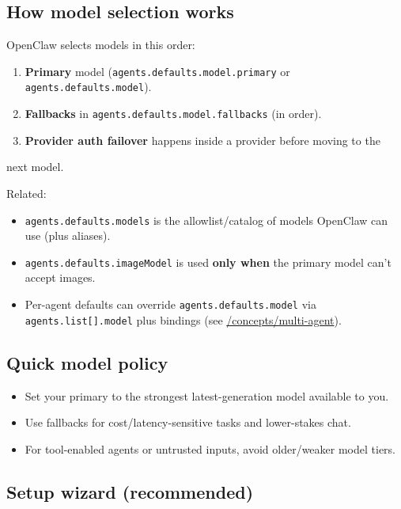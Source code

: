 \subsection{How model selection works}


OpenClaw selects models in this order:

\begin{enumerate}
  \item \textbf{Primary} model (\texttt{agents.defaults.model.primary} or \texttt{agents.defaults.model}).
  \item \textbf{Fallbacks} in \texttt{agents.defaults.model.fallbacks} (in order).
  \item \textbf{Provider auth failover} happens inside a provider before moving to the
\end{enumerate}

next model.

Related:

\begin{itemize}
  \item \texttt{agents.defaults.models} is the allowlist/catalog of models OpenClaw can use (plus aliases).
  \item \texttt{agents.defaults.imageModel} is used \textbf{only when} the primary model can’t accept images.
  \item Per-agent defaults can override \texttt{agents.defaults.model} via \texttt{agents.list[].model} plus bindings (see \href{/concepts/multi-agent}{/concepts/multi-agent}).
\end{itemize}


\subsection{Quick model policy}


\begin{itemize}
  \item Set your primary to the strongest latest-generation model available to you.
  \item Use fallbacks for cost/latency-sensitive tasks and lower-stakes chat.
  \item For tool-enabled agents or untrusted inputs, avoid older/weaker model tiers.
\end{itemize}


\subsection{Setup wizard (recommended)}


